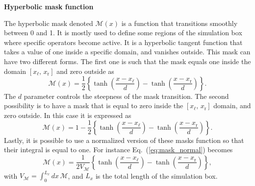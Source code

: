 \documentclass[11pt]{article}
\begin{document}
\begin{center}
    \LARGE \textbf{Hyperbolic mask function} \\
    \vspace{0.8cm} 
\end{center}

The hyperbolic mask denoted $\mathcal{M}(x)$ is a function that transitions smoothly between 0 and 1. It is mostly used to define some regions of the simulation box where specific operators become active. It is a hyperbolic tangent function that takes a value of one inside a specific domain, and vanishes outside. This mask can have two different forms. The first one is such that the mask equals one inside the domain  $\left[ x_\mathrm{\ell}, \, x_\mathrm{r} \right] $ and zero outside as
%
\begin{equation}\label{eq:mask_normal}
     \mathcal{M}(x) = \dfrac{1}{2}\left\{ \operatorname{tanh}{\left(\dfrac{x-x_\mathrm{\ell}}{d}\right)} - \operatorname{tanh}{\left(\dfrac{x-x_\mathrm{r}}{d}\right)}  \right\} .
\end{equation}
%
The $d$ parameter controls the steepness of the mask transition. The second possibility is to have a mask that is equal to zero inside the $\left[ x_\mathrm{\ell}, \, x_\mathrm{r} \right] $ domain, and zero outside. In this case it is expressed as
%
\begin{equation}\label{eq:mask_inverted}
     \mathcal{M}(x) = 1 - \dfrac{1}{2}\left\{ \operatorname{tanh}{\left(\dfrac{x-x_\mathrm{\ell}}{d}\right)} - \operatorname{tanh}{\left(\dfrac{x-x_\mathrm{r}}{d}\right)}  \right\} .
\end{equation}
%
Lastly, it is possible to use a normalized version of these masks function so that their integral is equal to one. For instance Eq.~(\ref{eq:mask_normal}) becomes  
%
\begin{equation*}\label{eq:mask_nmz}
     \mathcal{M}(x) = \dfrac{1}{2V_\mathcal{M}}\left\{ \operatorname{tanh}{\left(\dfrac{x-x_\mathrm{\ell}}{d}\right)} - \operatorname{tanh}{\left(\dfrac{x-x_\mathrm{r}}{d}\right)}  \right\},
\end{equation*}
%
with $V_\mathcal{M} = \int_{0}^{L_x} d x \, \mathcal{M}$, and $L_x$ is the total length of the simulation box.
\end{document}
